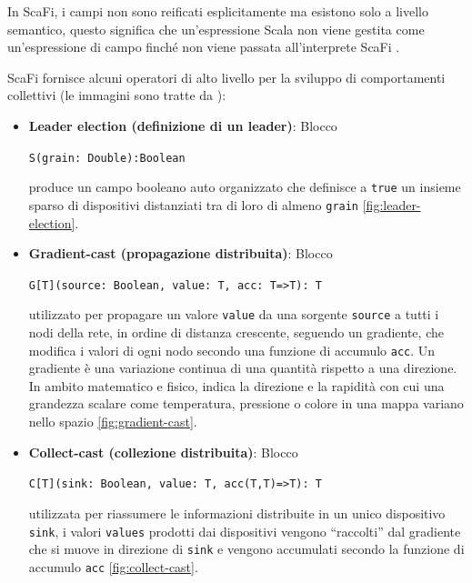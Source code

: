 \documentclass[12pt,a4paper,openright,twoside]{book}
\begin{document}
In ScaFi, i campi non sono reificati esplicitamente ma esistono solo a livello semantico, questo significa che un'espressione Scala non viene gestita come un'espressione di campo finché non viene passata all'interprete ScaFi \cite{CasadeiPhDThesis}.

ScaFi fornisce alcuni operatori di alto livello per la sviluppo di comportamenti collettivi \cite{Casadei2022} (le immagini sono tratte da \cite{CasadeiPhDThesis}):

\begin{itemize}
    \item \textbf{Leader election (definizione di un leader)}: Blocco 
    \begin{center}
        \verb|S(grain: Double):Boolean|
    \end{center}
    produce un campo booleano auto organizzato che definisce a \verb|true| un insieme sparso di dispositivi distanziati tra di loro di almeno \verb|grain| \cref{fig:leader-election}.
    \item \textbf{Gradient-cast (propagazione distribuita)}: Blocco 
    \begin{center}
        \verb|G[T](source: Boolean, value: T, acc: T=>T): T|
    \end{center}
    utilizzato per propagare un valore \verb|value| da una sorgente \verb|source| a tutti i nodi della rete, in ordine di distanza crescente, seguendo un gradiente, che modifica i valori di ogni nodo secondo una funzione di accumulo \verb|acc|. Un gradiente è una variazione continua di una quantità rispetto a una direzione. In ambito matematico e fisico, indica la direzione e la rapidità con cui una grandezza scalare come temperatura, pressione o colore in una mappa variano nello spazio \cref{fig:gradient-cast}.
    \item \textbf{Collect-cast (collezione distribuita)}: Blocco 
    \begin{center}
        \verb|C[T](sink: Boolean, value: T, acc(T,T)=>T): T| 
    \end{center}
    utilizzata per riassumere le informazioni distribuite in un unico dispositivo \verb|sink|, i valori \verb|values| prodotti dai dispositivi vengono ``raccolti'' dal gradiente che si muove in direzione di \verb|sink| e vengono accumulati secondo la funzione di accumulo \verb|acc| \cref{fig:collect-cast}.
\end{itemize}
\end{document}
